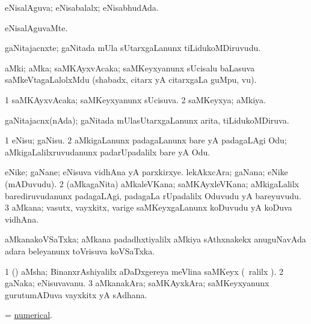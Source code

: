 \bentry
{}
\gl{\gu}
\bmng
eNisalAguva; eNisabalalx; eNisabhudAda. 
\emng
\eentry

\bentry
{}
\gl{\kirxvi}
\bmng
eNisalAguvaMte. 
\emng
\eentry

\bentry
{}
\gl{\nA}
\bmng
gaNitajacnxte; gaNitada mUla sUtarxgaLanunx tiLidukoMDiruvudu. 
\emng
\eentry

\bentry
{}
\gl{\nA}
\bmng
aMki; aMka; saMKAyxvAcaka; saMKeyxyanunx sUcisalu baLasuva saMkeVtagaLalolxMdu (shabadx, citarx yA citarxgaLa guMpu, \mo vu). 
\emng
\eentry

\bentry
{}
\gl{\gu}
\bmng
\bnum
\num{1} saMKAyxvAcaka; saMKeyxyanunx sUcisuva. 
\num{2} saMKeyxya; aMkiya. 
\enum
\emng
\eentry

\bentry
{}
\gl{\gu}
\bmng
gaNitajacnx(nAda); gaNitada mUlasUtarxgaLanunx arita, tiLidukoMDiruva. 
\emng
\eentry

\bentry
{}
\gl{\sakirx}
\bmng
\bnum
\num{1} eNisu; gaNisu. 
\num{2} aMkigaLanunx padagaLanunx bare yA padagaLAgi Odu; aMkigaLalilxruvudanunx padarUpadalilx bare yA Odu. 
\enum
\emng
\eentry

\bentry
{}
\gl{\nA}
\bmng
\bnum
{} 
\banum
{} eNike; gaNane; eNisuva vidhAna yA parxkirxye. 
 lekAkxcAra; gaNana; eNike (mADuvudu). 
\eanum
\numie
\num{2} (aMkagaNita) aMkaleVKana; saMKAyxleVKana; aMkigaLalilx barediruvudanunx padagaLAgi, padagaLa rUpadalilx Oduvudu yA bareyuvudu. 
\num{3} aMkana; vasutx, vayxkitx, \mo varige saMKeyxgaLanunx koDuvudu yA koDuva vidhAna. 
\enum
\emng
\eentry

\bentry
{}
\gl{\nA}
\bmng
aMkanakoVSaTxka; aMkana padadhxtiyalilx aMkiya sAthxnakekx anuguNavAda adara beleyanunx toVrisuva koVSaTxka. 
\emng
\eentry

\bentry
{}
\gl{\nA}
\bmng
\bnum
\num{1} (\ga) aMsha; BinanxrAshiyalilx aDaDxgereya meVlina saMKeyx (\udA\ \eng{$\frac\bg 2\eg\bg 3\eg$}ralilx ). 
\num{2} gaNaka; eNisuvavanu. 
\num{3} aMkanakAra; saMKAyxkAra; saMKeyxyanunx gurutumADuva vayxkitx yA sAdhana. 
\enum
\emng
\eentry

\bentry
{}
\gl{\gu}
\bmng
= \hyperlink{numerical}{numerical}. 
\emng
\eentry

